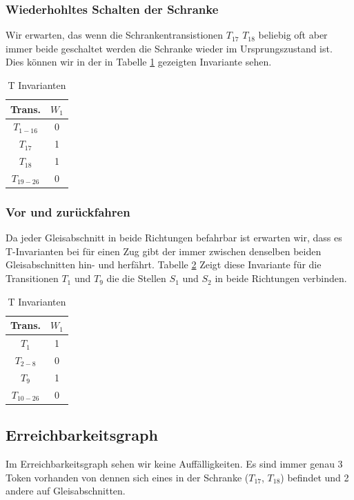\documentclass[10pt]{scrartcl}
\begin{document}
	\subsubsection{Wiederhohltes Schalten der Schranke}
	Wir erwarten, das wenn die Schrankentransistionen $T_{17}$ $T_{18}$ beliebig oft aber immer beide geschaltet werden die Schranke wieder im Ursprungszustand ist. Dies können wir in der in Tabelle \ref{t:inv:schrank} gezeigten Invariante sehen. 
	\begin{table}[H]
	\centering	
		\begin{tabular}{|c|c|}
	\hline Trans.  & $W_1$\\ 
	\hline $T_{1-16}$ & 0  \\ 
	\hline $T_{17}$ & 1 \\ 
	\hline $T_{18}$ & 1 \\ 
	\hline $T_{19-26}$ & 0 \\ 
	\hline 
	\end{tabular}
	\caption{T Invarianten}
	\label{t:inv:schrank}
	\end{table}	
	
\subsubsection{Vor und zurückfahren}
	Da jeder Gleisabschnitt in beide Richtungen befahrbar ist erwarten wir, dass es T-Invarianten bei für einen Zug gibt der immer zwischen denselben beiden Gleisabschnitten hin- und herfährt. Tabelle \ref{t:inv:vorzurueck} Zeigt diese Invariante für die Transitionen $T_1$ und $T_9$ die die Stellen $S_1$ und $S_2$ in beide Richtungen verbinden. 
	\begin{table}[H]
	\centering	
		\begin{tabular}{|c|c|}
	\hline Trans.  & $W_1$\\ 
	\hline $T_{1}$ & 1 \\
	\hline $T_{2-8}$ & 0  \\ 
	\hline $T_{9}$ & 1 \\ 
	\hline $T_{10-26}$ & 0 \\ 
	\hline 
	\end{tabular}
	\caption{T Invarianten}
	\label{t:inv:vorzurueck}
	\end{table}	
	
\subsection{Erreichbarkeitsgraph}
Im Erreichbarkeitsgraph sehen wir keine Auffälligkeiten. Es sind immer genau 3 Token vorhanden von dennen sich eines in der Schranke ($T_{17}$, $T_{18}$) befindet und 2 andere auf Gleisabschnitten.
\end{document}
